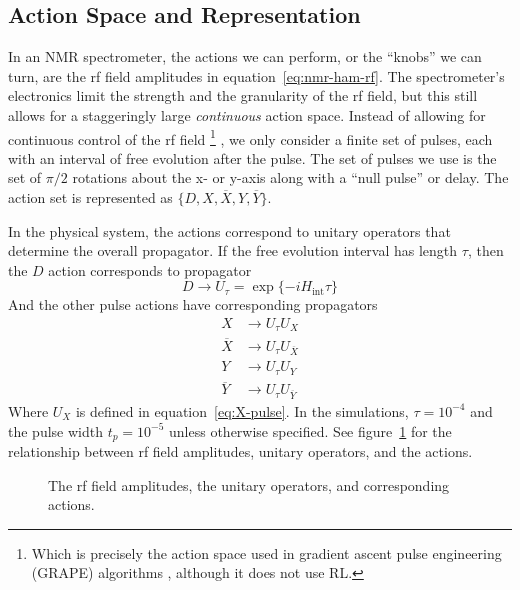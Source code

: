 \subsection{Action Space and Representation}

In an NMR spectrometer, the actions we can perform, or the ``knobs'' we can turn, are the rf field amplitudes in equation~\ref{eq:nmr-ham-rf}.
The spectrometer's electronics limit the strength and the granularity of the rf field,
but this still allows for a staggeringly large \emph{continuous} action space. Instead of allowing for continuous control of the rf field%
\footnote{
Which is precisely the action space used in gradient ascent pulse engineering (GRAPE) algorithms \cite{Khaneja-2005}, although it does not use RL.
}%
, we only consider a finite set of pulses, each with an interval of free evolution after the pulse. The set of pulses we use is the set of $\pi/2$ rotations about the x- or y-axis along with a ``null pulse'' or delay. The action set is represented as $\{ D, X, \overline{X}, Y, \overline{Y} \}$.



In the physical system, the actions correspond to unitary operators that determine the overall propagator. If the free evolution interval has length $\tau$, then the $D$ action corresponds to propagator
\[
D \longrightarrow U_{\tau} = \exp\{ -i H_{\text{int}} \tau \}
\]
And the other pulse actions have corresponding propagators
\begin{align*}
    X &\longrightarrow U_{\tau} U_X \\
    \overline{X} &\longrightarrow U_{\tau} U_{\overline{X}} \\
    Y & \longrightarrow U_{\tau} U_Y \\
    \overline{Y} &\longrightarrow U_{\tau} U_{\overline{Y}}
\end{align*}
Where $U_X$ is defined in equation~\ref{eq:X-pulse}. In the simulations, $\tau = 10^{-4}$ and the pulse width $t_p = 10^{-5}$ unless otherwise specified.
See figure~\ref{fig:actions} for the relationship between rf field amplitudes, unitary operators, and the actions.

\begin{figure}[H]
    \centering
    
    \caption{The rf field amplitudes, the unitary operators, and corresponding actions.}
    \label{fig:actions}
\end{figure}


